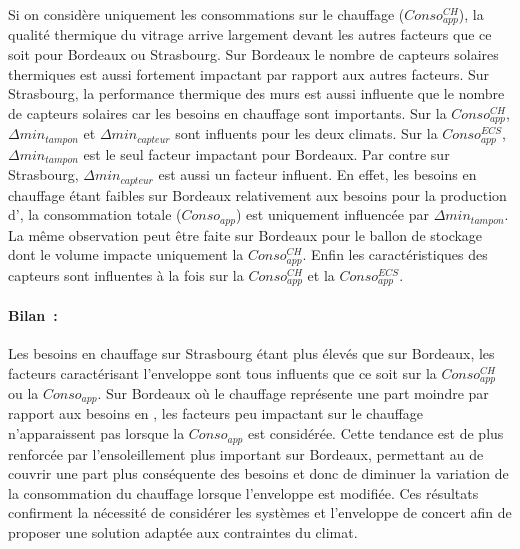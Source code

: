 Si on considère uniquement les consommations sur le chauffage ($Conso_{app}^{CH}$), la qualité
thermique du vitrage arrive largement devant les autres facteurs que ce soit pour Bordeaux
ou Strasbourg. Sur Bordeaux le nombre de capteurs solaires thermiques est aussi fortement
impactant par rapport aux autres facteurs. Sur Strasbourg, la performance thermique des
murs est aussi influente que le nombre de capteurs solaires car les besoins en chauffage
sont importants.
Sur la $Conso_{app}^{CH}$, $\Delta min_{tampon}$ et $\Delta min_{capteur}$ sont influents
pour les deux climats. Sur la $Conso_{app}^{ECS}$, $\Delta min_{tampon}$ est le seul
facteur impactant pour Bordeaux. Par contre sur Strasbourg, $\Delta min_{capteur}$ est aussi
un facteur influent. En effet, les besoins en chauffage étant faibles sur Bordeaux relativement aux
besoins pour la production d’, la consommation totale ($Conso_{app}$) est
uniquement influencée par $\Delta min_{tampon}$. La même observation peut
être faite sur Bordeaux pour le ballon de stockage dont le volume impacte uniquement la $Conso_{app}^{CH}$.
Enfin les caractéristiques des capteurs sont influentes à la fois sur la
$Conso_{app}^{CH}$ et la $Conso_{app}^{ECS}$.

\paragraph{Bilan~:} %
\label{par:bilan_conso_app}
Les besoins en chauffage sur Strasbourg étant plus
élevés que sur Bordeaux, les facteurs caractérisant l’enveloppe sont tous influents que
ce soit sur la $Conso_{app}^{CH}$ ou la $Conso_{app}$. Sur Bordeaux où le chauffage
représente une part moindre par rapport aux besoins en , les facteurs peu
impactant sur le chauffage n’apparaissent pas lorsque la $Conso_{app}$ est considérée.
Cette tendance est de plus renforcée par l’ensoleillement plus important sur Bordeaux,
permettant au  de couvrir une part plus conséquente des besoins et donc de diminuer
la variation de la consommation du chauffage lorsque l’enveloppe est modifiée. Ces
résultats confirment la nécessité de considérer les systèmes et l’enveloppe de concert
afin de proposer une solution adaptée aux contraintes du climat.



